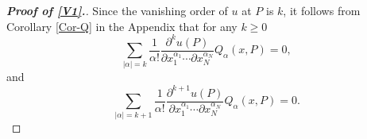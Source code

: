 \documentclass[10pt,a4paper]{amsart}
\newtheorem{comment}{Comment}
\newcommand\e\varepsilon
\begin{document}
\begin{proof}[\bf Proof of \eqref{V1}.]

            Since the vanishing order of $u$ at $P$ is $k$, it follows from Corollary \ref{Cor-Q} in the Appendix that for any $k\ge 0$
             \begin{equation}\label{eq1704-1}
					\sum_{|\alpha|=k}\frac1{\alpha!}
					\frac{\partial^ku(P)}{\partial x_1^{\alpha_1}\cdots\partial x_N^{\alpha_N}}Q_\alpha(x,P)=0,
				\end{equation}   
                and 
                \begin{equation}\label{eq1704-2}
					\sum_{|\alpha|=k+1}\frac1{\alpha!}
					\frac{\partial^{k+1}u(P)}{\partial x_1^{\alpha_1}\cdots\partial x_N^{\alpha_N}}Q_\alpha(x,P)=0.
				\end{equation}   

\end{proof}
\end{document}
